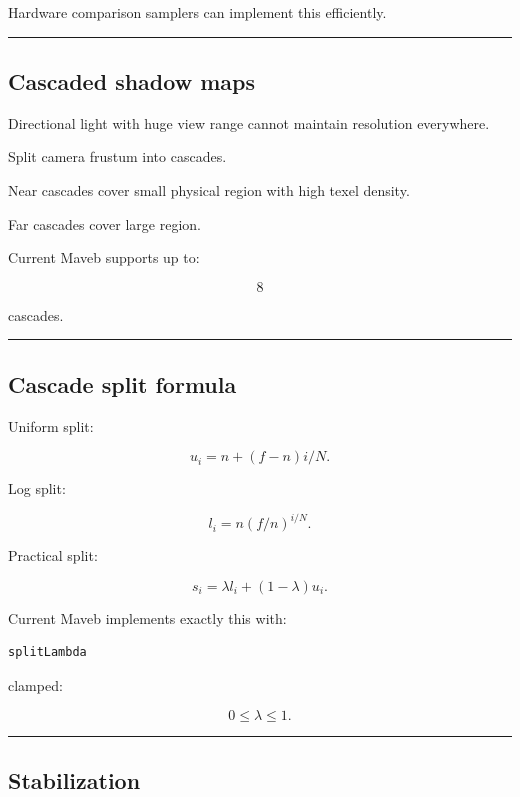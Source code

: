 Hardware comparison samplers can implement this efficiently.

\begin{center}\rule{0.5\linewidth}{0.5pt}\end{center}

\subsection{Cascaded shadow maps}\label{04-visual-computing-ii-ch040-cascaded-shadow-maps}

Directional light with huge view range cannot maintain resolution everywhere.

Split camera frustum into cascades.

Near cascades cover small physical region with high texel density.

Far cascades cover large region.

Current Maveb supports up to:

\[
8
\]

cascades.

\begin{center}\rule{0.5\linewidth}{0.5pt}\end{center}

\subsection{Cascade split formula}\label{04-visual-computing-ii-ch040-cascade-split-formula}

Uniform split:

\[
u_i=
n+(f-n)i/N.
\]

Log split:

\[
l_i=
n(f/n)^{i/N}.
\]

Practical split:

\[
\boxed{
s_i=
\lambda l_i+
(1-\lambda)u_i.
}
\]

Current Maveb implements exactly this with:

\begin{verbatim}
splitLambda
\end{verbatim}

clamped:

\[
0\le\lambda\le1.
\]

\begin{center}\rule{0.5\linewidth}{0.5pt}\end{center}

\subsection{Stabilization}\label{04-visual-computing-ii-ch040-stabilization}

